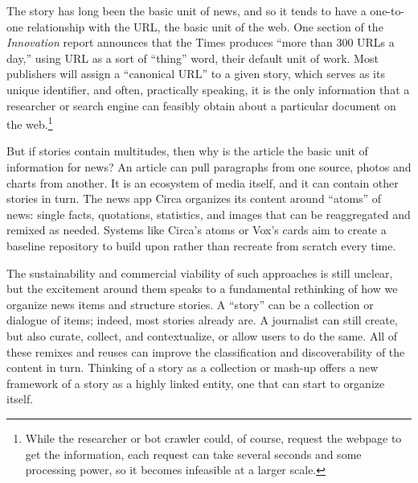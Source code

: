 The story has long been the basic unit of news, and so it tends to have a one-to-one relationship with the URL, the basic unit of the web. One section of the \emph{Innovation} report announces that the Times produces ``more than 300 URLs a day,'' using URL as a sort of ``thing'' word, their default unit of work.\autocite[27]{_innovation_2014} Most publishers will assign a ``canonical URL'' to a given story, which serves as its unique identifier, and often, practically speaking, it is the only information that a researcher or search engine can feasibly obtain about a particular document on the web.\footnote{While the researcher or bot crawler could, of course, request the webpage to get the information, each request can take several seconds and some processing power, so it becomes infeasible at a larger scale.}

But if stories contain multitudes, then why is the article the basic unit of information for news? An article can pull paragraphs from one source, photos and charts from another. It is an ecosystem of media itself, and it can contain other stories in turn. The news app Circa organizes its content around ``atoms'' of news: single facts, quotations, statistics, and images that can be reaggregated and remixed as needed. Systems like Circa's atoms or Vox's cards aim to create a baseline repository to build upon rather than recreate from scratch every time.

The sustainability and commercial viability of such approaches is still unclear, but the excitement around them speaks to a fundamental rethinking of how we organize news items and structure stories. A ``story'' can be a collection or dialogue of items; indeed, most stories already are. A journalist can still create, but also curate, collect, and contextualize, or allow users to do the same. All of these remixes and reuses can improve the classification and discoverability of the content in turn. Thinking of a story as a collection or mash-up offers a new framework of a story as a highly linked entity, one that can start to organize itself.

